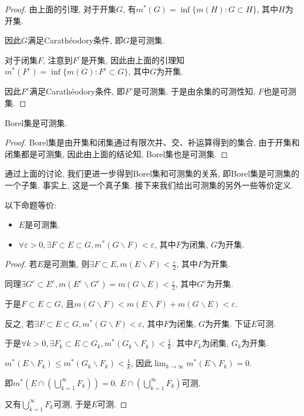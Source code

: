 \documentclass[theorem=false,mathfont=none,openany,sub3section]{easybook}
\begin{document}
\begin{proof}
  由上面的引理, 对于开集$G$, 有$m^{*}(G)=\inf\{m(H): G\subset H \}$, 其中$H$为开集.\par
  因此$G$满足Carathéodory条件, 即$G$是可测集.\par
  对于闭集$F$, 注意到$F^c$是开集, 因此由上面的引理知$m^{*}(F^c)=\inf\{m(G): F^c\subset G \}$, 其中$G$为开集.\par
  因此$F^c$满足Carathéodory条件, 即$F^c$是可测集. 于是由余集的可测性知, $F$也是可测集.\par
\end{proof}

\begin{theorem}
  Borel集是可测集.\par
\end{theorem}

\begin{proof}
  Borel集是由开集和闭集通过有限次并、交、补运算得到的集合, 由于开集和闭集都是可测集, 因此由上面的结论知, Borel集也是可测集.\par
\end{proof}

通过上面的讨论, 我们更进一步得到Borel集和可测集的关系, 即Borel集是可测集的一个子集. 事实上, 这是一个真子集. 接下来我们给出可测集的另外一些等价定义.\par

\begin{lemma}
  以下命题等价:\par
  \begin{itemize}
    \item $E$是可测集.
    \item $\forall \varepsilon>0, \exists F\subset E\subset G, m^{*}(G\backslash F)<\varepsilon $, 其中$F$为闭集, $G$为开集.
  \end{itemize}
\end{lemma}

\begin{proof}
  若$E$是可测集, 则$\exists F\subset E, m(E\backslash F)<\frac{\varepsilon}{2}$, 其中$F$为开集.\par
  同理$\exists G^c\subset E^c, m(E^c\backslash G^c)=m(G\backslash E)<\frac{\varepsilon}{2}$, 其中$G^c$为开集.\par
  于是$F\subset E\subset G$, 且$m(G\backslash F)<m(E\backslash F)+m(G\backslash E)<\varepsilon$.\par
  反之, 若$\exists F\subset E\subset G, m^{*}(G\backslash F)<\varepsilon $, 其中$F$为闭集, $G$为开集. 下证$E$可测.\par
  于是$\forall k>0, \exists F_k\subset E\subset G_k, m^{*}(G_k\backslash F_k)<\frac{1}{k}$. 其中$F_k$为闭集, $G_k$为开集.\par
  $m^{*}(E\backslash F_k)\leqslant m^{*}(G_k\backslash F_k)<\frac{1}{k}$, 因此$\lim_{k \to \infty}m^{*}(E\backslash F_k)=0$.\par
  即$m^{*}(E\cap (\bigcup_{k=1}^{\infty}F_k))=0$. $E\cap (\bigcup_{k=1}^{\infty}F_k)$可测.\par
  又有$\bigcup_{k=1}^{\infty}F_k$可测, 于是$E$可测.\par
\end{proof}
\end{document}
